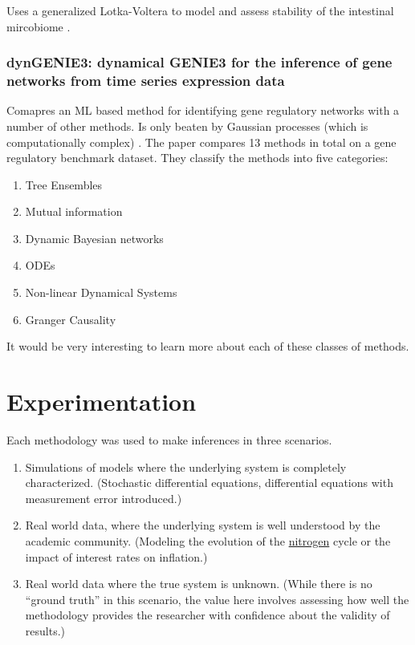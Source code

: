 \documentclass{article}
\begin{document}
        Uses a generalized Lotka-Voltera to model and assess stability of the intestinal mircobiome \cite{stein2013ecological}.
        
    \subsubsection*{dynGENIE3: dynamical GENIE3 for the inference of gene networks from time series expression data}
        Comapres an ML based method for identifying gene regulatory networks with a number of other methods. Is only
        beaten by Gaussian processes (which is computationally complex) \cite{huynhthu2018dynenie3}. The paper compares 
        13 methods in total on a gene regulatory benchmark dataset. They classify the methods into five categories:
        
        \begin{enumerate}
            \item Tree Ensembles
            \item Mutual information
            \item Dynamic Bayesian networks
            \item ODEs
            \item Non-linear Dynamical Systems
            \item Granger Causality
        \end{enumerate}

        It would be very interesting to learn more about each of these classes of methods.


\section*{Experimentation}

Each methodology was used to make inferences in three scenarios.
\begin{enumerate}
    \item Simulations of models where the underlying system is completely characterized. 
    (Stochastic differential equations, differential equations with measurement error introduced.)
    \item Real world data, where the underlying system is well understood by the academic community.
    (Modeling the evolution of the \href{https://www.sciencedirect.com/science/article/pii/S0045653520316866}{nitrogen}
    cycle or the impact of interest rates on inflation.)
    \item Real world data where the true system is unknown. (While there is no ``ground truth''
    in this scenario, the value here involves assessing how well the methodology provides the
    researcher with confidence about the validity of results.)
\end{enumerate}




\end{document}
